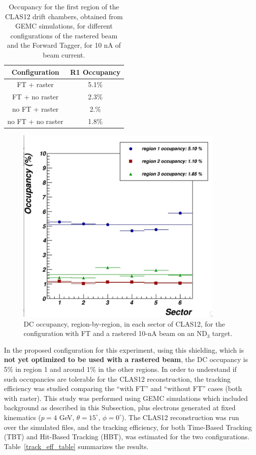 \begin{table}[htbp]
   \centering
   \begin{tabular}{|c||c|} 
	\hline
      Configuration    & R1 Occupancy \\
	\hline
      FT + raster & 5.1\%\\
      FT + no raster & 2.3\%\\
      no FT + raster & 2.\%\\
      no FT + no raster & 1.8\%\\
	\hline
   \end{tabular}
   \caption{Occupancy for the first region of the CLAS12 drift chambers, obtained from GEMC simulations, for different configurations of the rastered beam and the Forward Tagger, for 10 nA of beam current.}
   \label{tab:occupancy}
\end{table}
\begin{figure}[htbp] 
   \centering
   \includegraphics[width=4in]{Angela1.pdf} 
   \caption{DC occupancy, region-by-region, in each sector of CLAS12, for the configuration with FT and a rastered 10-nA beam on an ND$_3$ target.}
   \label{dc_occ}
\end{figure}
In the proposed configuration for this experiment, using this shielding, which is {\bf not yet optimized to be used with a rastered beam}, the DC occupancy is 5\% in region 1 and around 1\% in the other regions. In order to understand if such occupancies are tolerable for the CLAS12 reconstruction, the tracking efficiency was studied comparing the ``with FT'' and ``without FT'' cases (both with raster). This study was performed using GEMC simulations which included background as described in this Subsection, plus electrons generated at fixed kinematics ($p=4$ GeV, $\theta=15^{\circ}$, $\phi=0^{\circ}$). The CLAS12 reconstruction was run over the simulated files, and the tracking efficiency, for both Time-Based Tracking (TBT) and Hit-Based Tracking (HBT), was estimated for the two configurations. Table~\ref{track_eff_table} summarizes the results. 
